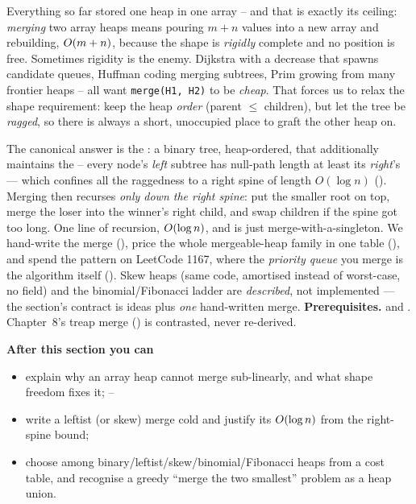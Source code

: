 \begin{topicintro}
Everything so far stored one heap in one array -- and that is exactly its ceiling: \emph{merging} two array
heaps means pouring $m+n$ values into a new array and rebuilding, $O(m+n)$, because the shape is
\emph{rigidly} complete and no position is free. Sometimes rigidity is the enemy. Dijkstra with a decrease
that spawns candidate queues, Huffman coding merging subtrees, Prim growing from many frontier heaps -- all
want \texttt{merge(H1, H2)} to be \emph{cheap}. That forces us to relax the shape requirement: keep the heap
\emph{order} (parent $\le$ children), but let the tree be \emph{ragged}, so there is always a short,
unoccupied place to graft the other heap on.

The canonical answer is the : a binary tree, heap-ordered, that additionally maintains
the  -- every node's \emph{left} subtree has null-path length at least its
\emph{right}'s --- which confines all the raggedness to a right spine of length $O(\log n)$
(). Merging then recurses \emph{only down the right spine}: put the smaller root on top,
merge the loser into the winner's right child, and swap children if the spine got too long. One line of
recursion, $O(\log n)$, and  is just merge-with-a-singleton. We hand-write the merge
(), price the whole mergeable-heap family in one table (), and
spend the pattern on LeetCode 1167, where the \emph{priority queue} you merge is the algorithm itself
(). Skew heaps (same code, amortised instead of worst-case, no  field) and
the binomial/Fibonacci ladder are \emph{described}, not implemented --- the section's contract is ideas plus
\emph{one} hand-written merge.
\textbf{Prerequisites.}  and . Chapter~8's treap merge
() is contrasted, never re-derived.

\textbf{After this section you can}
\begin{itemize}[nosep]
  \item explain why an array heap cannot merge sub-linearly, and what shape freedom fixes it; \hfill{}--
  \item write a leftist (or skew) merge cold and justify its $O(\log n)$ from the right-spine bound; \hfill{}
  \item choose among binary/leftist/skew/binomial/Fibonacci heaps from a cost table, and recognise a
        greedy ``merge the two smallest'' problem as a heap union. \hfill{}
\end{itemize}
\end{topicintro}


